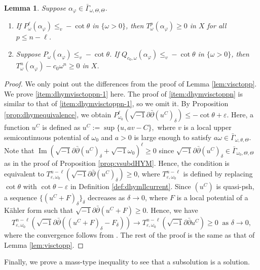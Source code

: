 \documentclass[10pt,a4paper]{amsart}
\numberwithin{equation}{section}
\newtheorem{lem}[equation]{Lemma}
\newcommand{\delb}{\sqrt{-1}\partial\bar{\partial}}
\begin{document}
\begin{lem}\label{lem:dhymvisctopp} Suppose $\alpha_\varphi\in\bar{\Gamma}_{\omega,\Theta,\Theta}$.
    \begin{enumerate}[label={\upshape(\roman*)}]
        \item\label{item:dhymvisctoppn-1} 
        If $P^\ell_{\omega}(\alpha_\varphi)\le_v -\cot\theta$ in $\{\omega>0\}$, then $T^p_\omega(\alpha_\varphi)\ge0$ in $X$ for all $p\le n-\ell$.
        \item\label{item:dhymvisctoppn} 
        Suppose $P_{\omega}(\alpha_\varphi)\le_v -\cot\theta$. If $Q_{c_0,\omega}(\alpha_\varphi)\le_v -\cot\theta$ in $\{\omega>0\}$, then $T^n_\omega(\alpha_\varphi)-c_0\omega^n\ge0$ in $X$. 
    \end{enumerate}
\end{lem}

\begin{proof}
    We only point out the differences from the proof of Lemma \ref{lem:visctopp}.
    We prove \ref{item:dhymvisctoppn-1} here. The proof of \ref{item:dhymvisctoppn} is similar to that of \ref{item:dhymvisctoppn-1}, so we omit it. By Proposition \ref{prop:dhymequivalence}, we obtain $P^\ell_{\omega_0}(\delb (u^C)_\delta)\le-\cot\theta+\varepsilon$. Here, a function $u^C$ is defined as $u^C:=\sup \{u,av-C\},$ where $v$ is a local upper semicontinuous potential of $\omega_0$ and $a>0$ is large enough to satisfy $a\omega\in\bar{\Gamma}_{\omega,\theta,\Theta}$.
    Note that $\operatorname{Im}(\delb (u^C)_\delta+\sqrt{-1}\omega_0)^\ell\ge0$ since $\delb (u^C)_\delta\in\bar{\Gamma}_{\omega_0,\Theta,\Theta}$ as in the proof of Proposition \ref{prop:vsubdHYM}. Hence, the condition is equivalent to $T^{n-\ell}_{\varepsilon,\omega_0}(\delb (u^C)_\delta)\ge0$, where $T^{n-\ell}_{\varepsilon,\omega_0}$ is defined by replacing $\cot\theta$ with $\cot\theta-\varepsilon$ in Definition \ref{def:dhymllcurrent}. Since $(u^C)$ is quasi-psh, a sequence $\{(u^C+F)_\delta\}_\delta$ decreases as $\delta\to0$, where $F$ is a local potential of a Kähler form such that $\delb (u^C+F)\ge0$.
    Hence, we have
    $$T^{n-\ell}_{\varepsilon,\omega_0}(\delb ((u^C+F)_\delta-F_\delta))\to T^{n-\ell}_{\varepsilon,\omega_0}(\delb u^C)\ge0 \ \text{ as } \delta\to0,$$
    where the convergence follows from \cite[Theorem 2.1]{BT}. The rest of the proof is the same as that of Lemma \ref{lem:visctopp}. 
\end{proof}

Finally, we prove a mass-type inequality to see that a subsolution is a solution.
\end{document}
